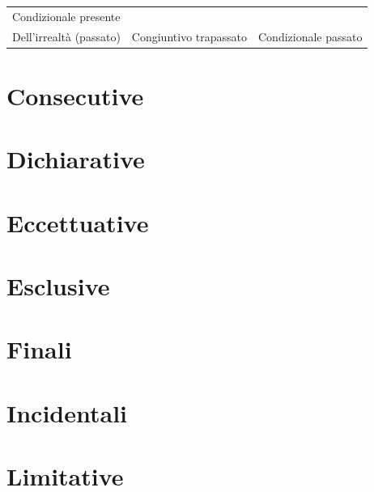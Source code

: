 \documentclass[
  a4paper,
  twoside,
  11pt,
  chapterprefix=false,
  bibliography=totocnumbered,
  listof=flat]{scrbook}
\begin{document}
\begin{longtable}[]{@{}lll@{}}
\begin{minipage}[t]{0.38\columnwidth}
Condizionale presente\strut
\end{minipage}\tabularnewline
\begin{minipage}[t]{0.28\columnwidth}\raggedright
Dell'irrealtà (passato)\strut
\end{minipage} & \begin{minipage}[t]{0.25\columnwidth}\raggedright
Congiuntivo trapassato\strut
\end{minipage} & \begin{minipage}[t]{0.38\columnwidth}\raggedright
Condizionale passato\strut
\end{minipage}\tabularnewline
\bottomrule
\end{longtable}

\hypertarget{consecutive}{%
\section{Consecutive}\label{consecutive}}

\hypertarget{dichiarative}{%
\section{Dichiarative}\label{dichiarative}}

\hypertarget{eccettuative}{%
\section{Eccettuative}\label{eccettuative}}

\hypertarget{esclusive}{%
\section{Esclusive}\label{esclusive}}

\hypertarget{finali}{%
\section{Finali}\label{finali}}

\hypertarget{incidentali}{%
\section{Incidentali}\label{incidentali}}

\hypertarget{limitative}{%
\section{Limitative}\label{limitative}}
\end{document}
